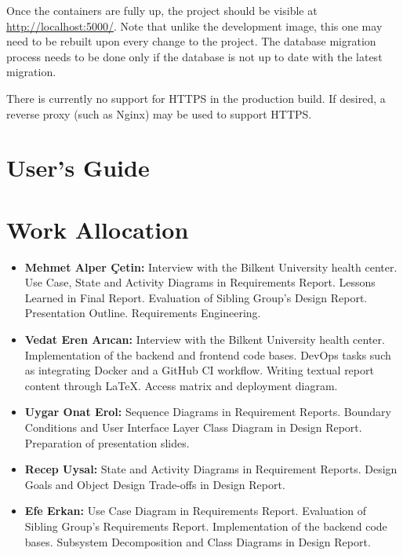 \documentclass[a4paper, 12pt, titlepage]{article}
\begin{document}
  Once the containers are fully up, the project should be visible at \url{http://localhost:5000/}.
  Note that unlike the development image, this one may need to be rebuilt upon every change to the project.
  The database migration process needs to be done only if the database is not up to date with the latest migration.
  
  There is currently no support for HTTPS in the production build.
  If desired, a reverse proxy (such as Nginx) may be used to support HTTPS.
  
  \pagebreak
  \section{User's Guide}

  
  
  \pagebreak
  \section{Work Allocation}
  
  \begin{itemize}
    \item \textbf{Mehmet Alper Çetin:}
      Interview with the Bilkent University health center.
      Use Case, State and Activity Diagrams in Requirements Report.
      Lessons Learned in Final Report.
      Evaluation of Sibling Group's Design Report.
      Presentation Outline.
      Requirements Engineering.
    \item \textbf{Vedat Eren Arıcan:}
      Interview with the Bilkent University health center.
      Implementation of the backend and frontend code bases.
      DevOps tasks such as integrating Docker and a GitHub CI workflow.
      Writing textual report content through \LaTeX{}. Access matrix and deployment diagram.
    \item \textbf{Uygar Onat Erol:}
      Sequence Diagrams in Requirement Reports.
      Boundary Conditions and User Interface Layer Class Diagram in Design Report.
      Preparation of presentation slides.
    \item \textbf{Recep Uysal:}
      State and Activity Diagrams in Requirement Reports.
      Design Goals and Object Design Trade-offs in Design Report.
    \item \textbf{Efe Erkan:}
      Use Case Diagram in Requirements Report.
      Evaluation of Sibling Group's Requirements Report.
      Implementation of the backend code bases.
      Subsystem Decomposition and Class Diagrams in Design Report.
  \end{itemize}
\end{document}
